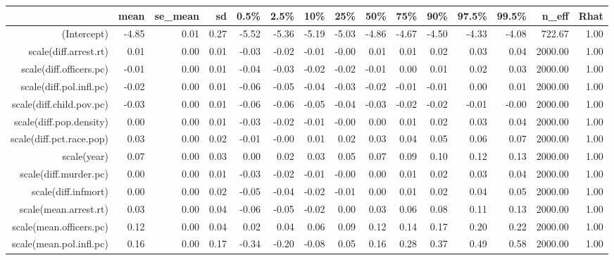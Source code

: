 \begin{table}[ht]
\centering
\begin{tabular}{rrrrrrrrrrrrrrr}
  \hline
 & mean & se\_mean & sd & 0.5\% & 2.5\% & 10\% & 25\% & 50\% & 75\% & 90\% & 97.5\% & 99.5\% & n\_eff & Rhat \\ 
  \hline
(Intercept) & -4.85 & 0.01 & 0.27 & -5.52 & -5.36 & -5.19 & -5.03 & -4.86 & -4.67 & -4.50 & -4.33 & -4.08 & 722.67 & 1.00 \\ 
  scale(diff.arrest.rt) & 0.01 & 0.00 & 0.01 & -0.03 & -0.02 & -0.01 & -0.00 & 0.01 & 0.01 & 0.02 & 0.03 & 0.04 & 2000.00 & 1.00 \\ 
  scale(diff.officers.pc) & -0.01 & 0.00 & 0.01 & -0.04 & -0.03 & -0.02 & -0.02 & -0.01 & 0.00 & 0.01 & 0.02 & 0.03 & 2000.00 & 1.00 \\ 
  scale(diff.pol.infl.pc) & -0.02 & 0.00 & 0.01 & -0.06 & -0.05 & -0.04 & -0.03 & -0.02 & -0.01 & -0.01 & 0.00 & 0.01 & 2000.00 & 1.00 \\ 
  scale(diff.child.pov.pc) & -0.03 & 0.00 & 0.01 & -0.06 & -0.06 & -0.05 & -0.04 & -0.03 & -0.02 & -0.02 & -0.01 & -0.00 & 2000.00 & 1.00 \\ 
  scale(diff.pop.density) & 0.00 & 0.00 & 0.01 & -0.03 & -0.02 & -0.01 & -0.00 & 0.00 & 0.01 & 0.02 & 0.03 & 0.04 & 2000.00 & 1.00 \\ 
  scale(diff.pct.race.pop) & 0.03 & 0.00 & 0.02 & -0.01 & -0.00 & 0.01 & 0.02 & 0.03 & 0.04 & 0.05 & 0.06 & 0.07 & 2000.00 & 1.00 \\ 
  scale(year) & 0.07 & 0.00 & 0.03 & 0.00 & 0.02 & 0.03 & 0.05 & 0.07 & 0.09 & 0.10 & 0.12 & 0.13 & 2000.00 & 1.00 \\ 
  scale(diff.murder.pc) & 0.00 & 0.00 & 0.01 & -0.03 & -0.02 & -0.01 & -0.00 & 0.00 & 0.01 & 0.02 & 0.03 & 0.04 & 2000.00 & 1.00 \\ 
  scale(diff.infmort) & 0.00 & 0.00 & 0.02 & -0.05 & -0.04 & -0.02 & -0.01 & 0.00 & 0.01 & 0.02 & 0.04 & 0.05 & 2000.00 & 1.00 \\ 
  scale(mean.arrest.rt) & 0.03 & 0.00 & 0.04 & -0.06 & -0.05 & -0.02 & 0.00 & 0.03 & 0.06 & 0.08 & 0.11 & 0.13 & 2000.00 & 1.00 \\ 
  scale(mean.officers.pc) & 0.12 & 0.00 & 0.04 & 0.02 & 0.04 & 0.06 & 0.09 & 0.12 & 0.14 & 0.17 & 0.20 & 0.22 & 2000.00 & 1.00 \\ 
  scale(mean.pol.infl.pc) & 0.16 & 0.00 & 0.17 & -0.34 & -0.20 & -0.08 & 0.05 & 0.16 & 0.28 & 0.37 & 0.49 & 0.58 & 2000.00 & 1.00 \\ 

\end{tabular}
\end{table}
